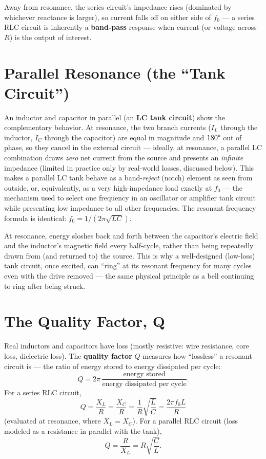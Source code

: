 Away from resonance, the series circuit's impedance rises (dominated by
whichever reactance is larger), so current falls off on either side of
$f_0$ --- a series RLC circuit is inherently a \textbf{band-pass}
response when current (or voltage across $R$) is the output of interest.

\section{Parallel Resonance (the ``Tank Circuit'')}

An inductor and capacitor in parallel (an \textbf{LC tank circuit}) show
the complementary behavior. At resonance, the two branch currents
($I_L$ through the inductor, $I_C$ through the capacitor) are equal in
magnitude and $180\degree$ out of phase, so they cancel in the external
circuit --- ideally, at resonance, a parallel LC combination draws
\emph{zero} net current from the source and presents an
\emph{infinite} impedance (limited in practice only by real-world
losses, discussed below). This makes a parallel LC tank behave as a
band-\emph{reject} (notch) element as seen from outside, or,
equivalently, as a very high-impedance load exactly at $f_0$ --- the
mechanism used to select one frequency in an oscillator or amplifier
tank circuit while presenting low impedance to all other frequencies.
The resonant frequency formula is identical: $f_0 = 1/(2\pi\sqrt{LC})$.

\begin{keyidea}
At resonance, energy sloshes back and forth between the capacitor's
electric field and the inductor's magnetic field every half-cycle,
rather than being repeatedly drawn from (and returned to) the source.
This is why a well-designed (low-loss) tank circuit, once excited, can
``ring'' at its resonant frequency for many cycles even with the drive
removed --- the same physical principle as a bell continuing to ring
after being struck.
\end{keyidea}

\section{The Quality Factor, Q}
\label{sec:q-factor}

Real inductors and capacitors have loss (mostly resistive: wire
resistance, core loss, dielectric loss). The \textbf{quality factor}
$Q$ measures how ``lossless'' a resonant circuit is --- the ratio of
energy stored to energy dissipated per cycle:
\[
Q = 2\pi\,\frac{\text{energy stored}}{\text{energy dissipated per cycle}}.
\]
For a series RLC circuit,
\[
\boxed{Q = \frac{X_L}{R} = \frac{X_C}{R} = \frac{1}{R}\sqrt{\frac{L}{C}} = \frac{2\pi f_0 L}{R}}
\]
(evaluated at resonance, where $X_L=X_C$). For a parallel RLC circuit
(loss modeled as a resistance in parallel with the tank),
\[
Q = \frac{R}{X_L} = R\sqrt{\frac{C}{L}}.
\]

